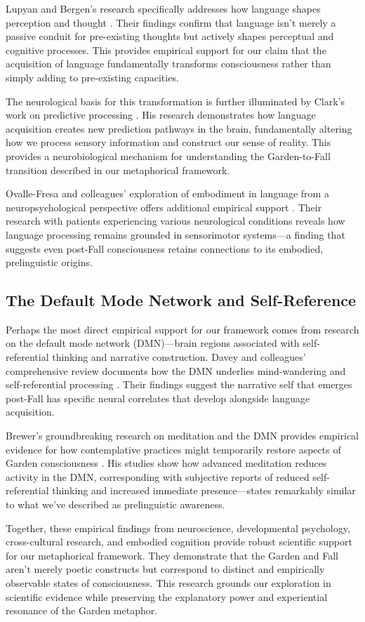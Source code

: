 Lupyan and Bergen's research specifically addresses how language shapes perception and thought \parencite{lupyan2023language}. Their findings confirm that language isn't merely a passive conduit for pre-existing thoughts but actively shapes perceptual and cognitive processes. This provides empirical support for our claim that the acquisition of language fundamentally transforms consciousness rather than simply adding to pre-existing capacities.

The neurological basis for this transformation is further illuminated by Clark's work on predictive processing \parencite{clark2023predictive}. His research demonstrates how language acquisition creates new prediction pathways in the brain, fundamentally altering how we process sensory information and construct our sense of reality. This provides a neurobiological mechanism for understanding the Garden-to-Fall transition described in our metaphorical framework.

Ovalle-Fresa and colleagues' exploration of embodiment in language from a neuropsychological perspective offers additional empirical support \parencite{ovalle2024exploration}. Their research with patients experiencing various neurological conditions reveals how language processing remains grounded in sensorimotor systems—a finding that suggests even post-Fall consciousness retains connections to its embodied, prelinguistic origins.

\subsection{The Default Mode Network and Self-Reference}

Perhaps the most direct empirical support for our framework comes from research on the default mode network (DMN)—brain regions associated with self-referential thinking and narrative construction. Davey and colleagues' comprehensive review documents how the DMN underlies mind-wandering and self-referential processing \parencite{davey2024default}. Their findings suggest the narrative self that emerges post-Fall has specific neural correlates that develop alongside language acquisition.

Brewer's groundbreaking research on meditation and the DMN provides empirical evidence for how contemplative practices might temporarily restore aspects of Garden consciousness \parencite{brewer2024meditation}. His studies show how advanced meditation reduces activity in the DMN, corresponding with subjective reports of reduced self-referential thinking and increased immediate presence—states remarkably similar to what we've described as prelinguistic awareness.

Together, these empirical findings from neuroscience, developmental psychology, cross-cultural research, and embodied cognition provide robust scientific support for our metaphorical framework. They demonstrate that the Garden and Fall aren't merely poetic constructs but correspond to distinct and empirically observable states of consciousness. This research grounds our exploration in scientific evidence while preserving the explanatory power and experiential resonance of the Garden metaphor.
